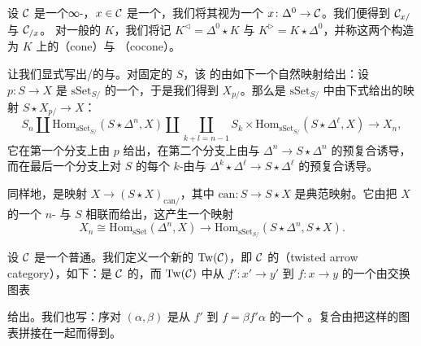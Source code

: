 \begin{example*}
设 $\mathcal{C}$ 是一个∞-\trCategory{}，$x \in \mathcal{C}$ 是一个\trObject{}，我们将其视为一个%
\trFunctor{} $x\colon \Delta^0 \to \mathcal{C}$。我们便得到\trSlice{} $\mathcal{C}_{x/}$ 与 $\mathcal{C}_{/x}$。
对一般的\trSimplicialSet{} $K$，我们将记 $K^{\triangleleft} = \Delta^0 \star K$
与 $K^{\triangleright} = K \star \Delta^0$，并称这两个构造为 $K$ 上的\trCone{}（cone）与%
\trCocone{}（cocone）。
\end{example*}

\begin{observation}\label{obs:slice-join-unit-counit}
让我们显式写出\trSlice{}/\trJoin{}\trAdjunction{}的\trUnit{}与\trCounit{}。对固定的\trSimplicialSet{} $S$，该%
\trAdjunction{}的\trCounit{}由如下一个自然映射给出：设 $p\colon S \to X$ 是
$\mathrm{sSet}_{S/}$ 的一个\trObject{}，于是我们得到\trSlice{} $X_{p/}$。那么\trCounit{}是
$\mathrm{sSet}_{S/}$ 中由下式给出的映射 $S \star X_{p/} \to X$：
\[
S_n \amalg \mathrm{Hom}_{\mathrm{sSet}_{S/}}(S \star \Delta^n, X) \amalg
\coprod_{k+l=n-1} S_k \times
\mathrm{Hom}_{\mathrm{sSet}_{S/}}(S \star \Delta^\ell, X) \to X_n,
\]
它在第一个分支上由 $p$ 给出，在第二个分支上由与 $\Delta^n \to S \star \Delta^n$
的预复合诱导，而在最后一个分支上对 $S$ 的每个 $k$-\trSimplex{}由与
$\Delta^k \star \Delta^\ell \to S \star \Delta^\ell$ 的预复合诱导。

同样地，\trUnit{}是映射 $X \to (S \star X)_{\mathrm{can}/}$，其中
$\mathrm{can}\colon S \to S \star X$ 是典范映射。它由把 $X$ 的一个
$n$-\trSimplex{} 与 $S$ 相联而给出，这产生一个映射
\[
X_n \cong \mathrm{Hom}_{\mathrm{sSet}}(\Delta^n, X) \to
\mathrm{Hom}_{\mathrm{sSet}_{S/}}(S \star \Delta^n, S \star X).
\]
\end{observation}

\begin{definition}\label{def:twisted-arrow-category}
设 $\mathcal{C}$ 是一个普通\trCategory{}。我们定义一个新的\trCategory{}%
$\mathrm{Tw}(\mathcal{C})$，即 $\mathcal{C}$ 的\emph{\trTwistedArrowCategory{}}（twisted arrow
category），如下：\trObject{}是 $\mathcal{C}$ 的\trMorphism{}，而 $\mathrm{Tw}(\mathcal{C})$ 中从
$f'\colon x' \to y'$ 到 $f\colon x \to y$ 的一个\trMorphism{}由交换图表
\begin{center}
\end{center}
给出。我们也写：序对 $(\alpha, \beta)$ 是从 $f'$ 到 $f = \beta f' \alpha$ 的一个%
\trMorphism{}。复合由把这样的图表拼接在一起而得到。
\end{definition}

